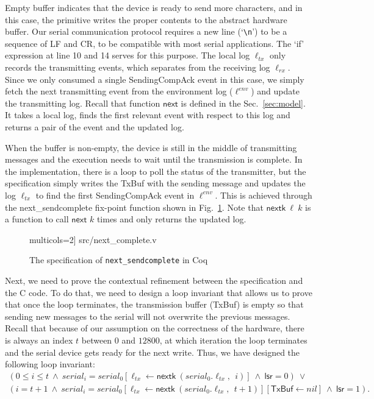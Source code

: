 Empty buffer indicates that the device is ready to send more characters, and in
this case, the primitive writes the proper contents to the abstract hardware
buffer. Our serial communication protocol requires a new line
(`\texttt{\textbackslash n}') to be a sequence of \textsf{LF} and \textsf{CR}, to
be compatible with most serial applications. The `if' expression at line 10 and
14 serves for this purpose. The local log $\ell_{tx}$  only records the
transmitting events, which separates from the receiving log $\ell_{rx}$. Since we
only consumed a single \textsf{SendingCompAck} event in this case, we simply
fetch the next transmitting event from the environment log ($\ell^{env}$) and
update the transmitting log. Recall that function $\textsf{next}$ is defined in
the Sec.~\ref{sec:model}. It takes a local log, finds the first relevant event
with respect to this log and returns a pair of the event and the updated log.

When the buffer is non-empty, the device is still in the middle of transmitting
messages and the execution needs to wait until the transmission is complete. In
the implementation, there is a loop to poll the status of the transmitter, but
the specification simply writes the TxBuf with the sending message and updates
the log $\ell_{tx}$ to find the first \textsf{SendingCompAck} event in
$\ell^{env}$. This is achieved through the \textsf{next\_sendcomplete} fix-point
function shown in Fig.~\ref{fig:next_complete}. Note that
$\textsf{nextk}~\ell~k$ is a function to call $\textsf{next}$ $k$ times and only
returns the updated log.

\begin{figure}
	 multicols=2] {src/next_complete.v}
	\caption{The specification of \texttt{next\_sendcomplete} in Coq}
	\label{fig:next_complete}
\end{figure}

Next, we need to prove the contextual refinement between the specification and
the C code. To do that, we need to design a loop invariant that allows us to
prove that once the loop terminates, the transmission buffer (TxBuf) is empty so
that sending new messages to the serial will not overwrite the previous
messages. Recall that because of our assumption on the correctness of the
hardware, there is always an index $t$ between $0$ and $12800$, at which
iteration the loop terminates and the serial device gets ready for the next write.
Thus, we have designed the following loop invariant:
\[
\begin{array}{l}
(0 \le i \le t ~\wedge~ serial_i = serial_0[\ell_{tx} \leftarrow \textsf{nextk}~ (serial_0.\ell_{tx},~~ i)] ~\wedge~ \textsf{lsr} = 0) ~\vee~ \\
(i = t + 1 ~\wedge~ serial_i = serial_0[\ell_{tx} \leftarrow \textsf{nextk}~ (serial_0.\ell_{tx}, ~~t + 1)][\textsf{TxBuf} \leftarrow nil] ~\wedge~ \textsf{lsr} = 1).
\end{array}
\]

